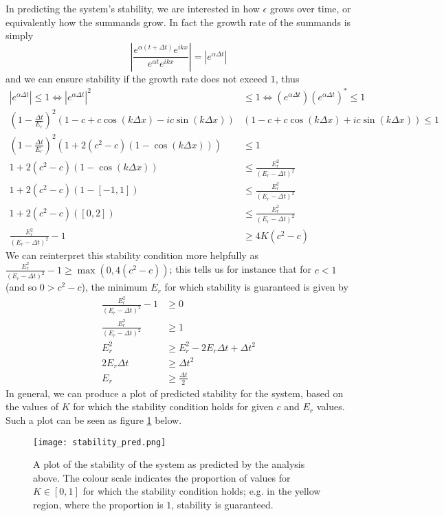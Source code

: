 \documentclass[11pt]{article}
\begin{document}
In predicting the system's stability, we are interested in how $\epsilon$ grows over time, or equivalently how the summands grow. In fact the growth rate of the summands is simply
\[
\left|\frac{e^{\alpha\left(t+\Delta t\right)}e^{ikx}}{e^{\alpha t}e^{ikx}}\right| = \left|e^{\alpha\Delta t}\right|
\]
and we can ensure stability if the growth rate does not exceed $1$, thus
\begin{align*}
\left|e^{\alpha\Delta t}\right|\leq 1 \Leftrightarrow
\left|e^{\alpha\Delta t}\right|^2&\leq 1 \Leftrightarrow
\left(e^{\alpha\Delta t}\right)\left(e^{\alpha\Delta t}\right)^*\leq 1 \\
\left(1-\frac{\Delta t}{E_r}\right)^2
\left(1-c+c\cos\left(k\Delta x\right)-ic\sin\left(k\Delta x\right)\right) &
\left(1-c+c\cos\left(k\Delta x\right)+ic\sin\left(k\Delta x\right)\right)\leq 1 \\
\left(1-\frac{\Delta t}{E_r}\right)^2\left(1+2(c^2-c)(1-\cos(k\Delta x))\right) &\leq 1 \\
1+2(c^2-c)(1-\cos(k\Delta x)) &\leq \frac{E_r^2}{\left(E_r-\Delta t\right)^2}	\tag{$\forall k$} \\
1+2(c^2-c)(1-[-1,1]) &\leq \frac{E_r^2}{\left(E_r-\Delta t\right)^2} \\
1+2(c^2-c)([0,2]) &\leq \frac{E_r^2}{\left(E_r-\Delta t\right)^2} \\
\frac{E_r^2}{\left(E_r-\Delta t\right)^2}-1 &\geq 4K(c^2-c)		\tag{$\forall K\in[0,1]$}
\end{align*}
We can reinterpret this stability condition more helpfully as $\frac{E_r^2}{\left(E_r-\Delta t\right)^2}-1\geq\max\left(0,4(c^2-c)\right)$; this tells us for instance that for $c<1$ (and so $0>c^2-c$), the minimum $E_r$ for which stability is guaranteed is given by
\begin{align*}
\frac{E_r^2}{\left(E_r-\Delta t\right)^2}-1&\geq 0 \\
\frac{E_r^2}{\left(E_r-\Delta t\right)^2} &\geq 1 \\
E_r^2 &\geq E_r^2 - 2E_r\Delta t + \Delta t^2 \\
2E_r\Delta t &\geq \Delta t^2 \\
E_r &\geq \frac{\Delta t}{2}
\end{align*}
In general, we can produce a plot of predicted stability for the system, based on the values of $K$ for which the stability condition holds for given $c$ and $E_r$ values. Such a plot can be seen as figure \ref{fig:stability_pred} below.
\begin{figure}[H]
\centering
\texttt{[image: stability\_pred.png]}
\caption{A plot of the stability of the system as predicted by the analysis above. The colour scale indicates the proportion of values for $K\in[0,1]$ for which the stability condition holds; e.g. in the yellow region, where the proportion is $1$, stability is guaranteed.}
\label{fig:stability_pred}
\end{figure}

\newpage


\end{document}
